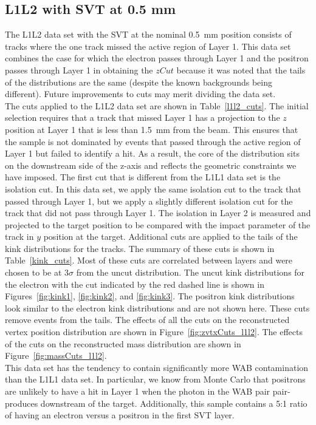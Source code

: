 \subsection{L1L2 with SVT at 0.5 mm}

The L1L2 data set with the SVT at the nominal 0.5~mm position consists of tracks where the one track missed the active region of Layer 1. This data set combines the case for which the electron passes through Layer 1 and the positron passes through Layer 1 in obtaining the $zCut$ because it was noted that the tails of the distributions are the same (despite the known backgrounds being different). Future improvements to cuts may merit dividing the data set.\\
\indent The cuts applied to the L1L2 data set are shown in Table~\ref{l1l2_cuts}. The initial selection requires that a track that missed Layer 1 has a projection to the $z$ position at Layer 1 that is less than 1.5~mm from the beam. This ensures that the sample is not dominated by events that passed through the active region of Layer 1 but failed to identify a hit. As a result, the core of the distribution sits on the downstream side of the z-axis and reflects the geometric constraints we have imposed. The first cut that is different from the L1L1 data set is the isolation cut. In this data set, we apply the same isolation cut to the track that passed through Layer 1, but we apply a slightly different isolation cut for the track that did not pass through Layer 1. The isolation in Layer 2 is measured and projected to the target position to be compared with the impact parameter of the track in $y$ position at the target. Additional cuts are applied to the tails of the kink distributions for the tracks. The summary of these cuts is shown in Table~\ref{kink_cuts}. Most of these cuts are correlated between layers and were chosen to be at 3$\sigma$ from the uncut distribution. The uncut kink distributions for the electron with the cut indicated by the red dashed line is shown in Figures~\ref{fig:kink1}, \ref{fig:kink2}, and \ref{fig:kink3}. The positron kink distributions look similar to the electron kink distributions and are not shown here. These cuts remove events from the tails. The effects of all the cuts on the reconstructed vertex position distribution are shown in Figure~\ref{fig:zvtxCuts_l1l2}. The effects of the cuts on the reconstructed mass distribution are shown in Figure~\ref{fig:massCuts_l1l2}.\\
\indent This data set has the tendency to contain significantly more WAB contamination than the L1L1 data set. In particular, we know from Monte Carlo that positrons are unlikely to have a hit in Layer 1 when the photon in the WAB pair pair-produces downstream of the target. Additionally, this sample contains a 5:1 ratio of having an electron versus a positron in the first SVT layer. 

